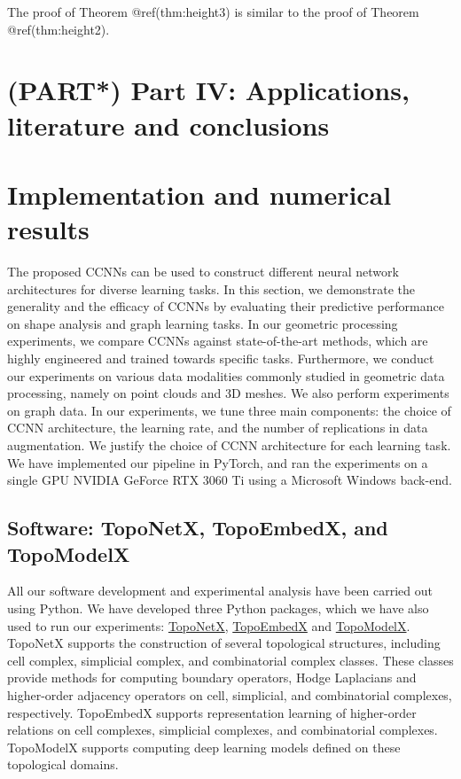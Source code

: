 \documentclass[
  12pt,
]{krantz}
\begin{document}
The proof of Theorem @ref(thm:height3) is similar to the proof of
Theorem @ref(thm:height2).

\section*{(PART*) Part IV: Applications, literature and
conclusions}\label{part-part-iv-applications-literature-and-conclusions}

\section{Implementation and numerical
results}\label{implementation-and-numerical-results}

The proposed CCNNs can be used to construct different neural network
architectures for diverse learning tasks. In this section, we
demonstrate the generality and the efficacy of CCNNs by evaluating their
predictive performance on shape analysis and graph learning tasks. In
our geometric processing experiments, we compare CCNNs against
state-of-the-art methods, which are highly engineered and trained
towards specific tasks. Furthermore, we conduct our experiments on
various data modalities commonly studied in geometric data processing,
namely on point clouds and 3D meshes. We also perform experiments on
graph data. In our experiments, we tune three main components: the
choice of CCNN architecture, the learning rate, and the number of
replications in data augmentation. We justify the choice of CCNN
architecture for each learning task. We have implemented our pipeline in
PyTorch, and ran the experiments on a single GPU NVIDIA GeForce RTX 3060
Ti using a Microsoft Windows back-end.

\subsection{Software: TopoNetX, TopoEmbedX, and
TopoModelX}\label{software-toponetx-topoembedx-and-topomodelx}

All our software development and experimental analysis have been carried
out using Python. We have developed three Python packages, which we have
also used to run our experiments:
\href{https://github.com/pyt-team/TopoNetX}{TopoNetX},
\href{https://github.com/pyt-team/TopoEmbedX}{TopoEmbedX} and
\href{https://github.com/pyt-team/TopoModelX}{TopoModelX}. TopoNetX
supports the construction of several topological structures, including
cell complex, simplicial complex, and combinatorial complex classes.
These classes provide methods for computing boundary operators, Hodge
Laplacians and higher-order adjacency operators on cell, simplicial, and
combinatorial complexes, respectively. TopoEmbedX supports
representation learning of higher-order relations on cell complexes,
simplicial complexes, and combinatorial complexes. TopoModelX supports
computing deep learning models defined on these topological domains.
\end{document}
